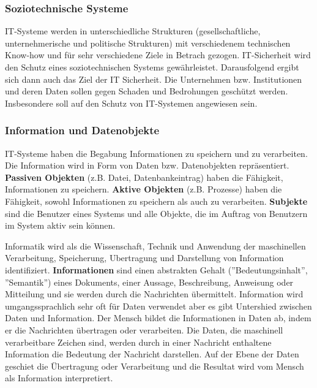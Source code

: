\subsubsection{Soziotechnische Systeme}

IT-Systeme werden in unterschiedliche Strukturen (gesellschaftliche, unternehmerische und politische Strukturen) mit verschiedenem technischen Know-how und für sehr verschiedene Ziele in Betrach gezogen\cite[23]{eckert2013sicherheit}. IT-Sicherheit wird den Schutz eines soziotechnischen Systems gewährleistet. Darausfolgend ergibt sich dann auch das Ziel der IT Sicherheit. Die Unternehmen bzw. Institutionen und deren Daten sollen gegen Schaden und Bedrohungen geschützt werden. Insbesondere soll auf den Schutz von IT-Systemen angewiesen sein\cite{so18tech}. 

\subsubsection{Information und Datenobjekte}

IT-Systeme haben die Begabung Informationen zu speichern und zu verarbeiten. Die Information wird in Form von Daten bzw. Datenobjekten repräsentiert. \textbf{Passiven Objekten} (z.B. Datei, Datenbankeintrag) haben die Fähigkeit, Informationen zu speichern. \textbf{Aktive Objekten} (z.B. Prozesse) haben die Fähigkeit, sowohl Informationen zu speichern als auch zu verarbeiten\cite[23]{eckert2013sicherheit}.  \textbf{Subjekte} sind die Benutzer eines Systems und alle Objekte, die im Auftrag von Benutzern im System aktiv sein können\cite[24]{eckert2013sicherheit}. 

Informatik wird als die Wissenschaft, Technik und Anwendung der maschinellen Verarbeitung, Speicherung, Ubertragung und Darstellung von Information identifiziert. \textbf{Informationen} sind einen abstrakten Gehalt (''Bedeutungsinhalt'', ''Semantik'') eines Dokuments, einer Aussage, Beschreibung, Anweisung oder Mitteilung\cite[5]{broy2013informatik} und sie werden durch die Nachrichten übermittelt\cite[18]{blieberger2013informatik}. Information wird umgangssprachlich sehr oft für Daten verwendet aber es gibt Untershied zwischen Daten und Information. Der Mensch bildet die Informationen in Daten ab, indem er die Nachrichten übertragen oder verarbeiten. Die Daten, die maschinell verarbeitbare Zeichen sind, werden durch in einer Nachricht enthaltene Information die Bedeutung der Nachricht darstellen. Auf der Ebene der Daten geschiet die Übertragung oder Verarbeitung und die Resultat wird vom Mensch als Information interpretiert\cite{infstd}.

